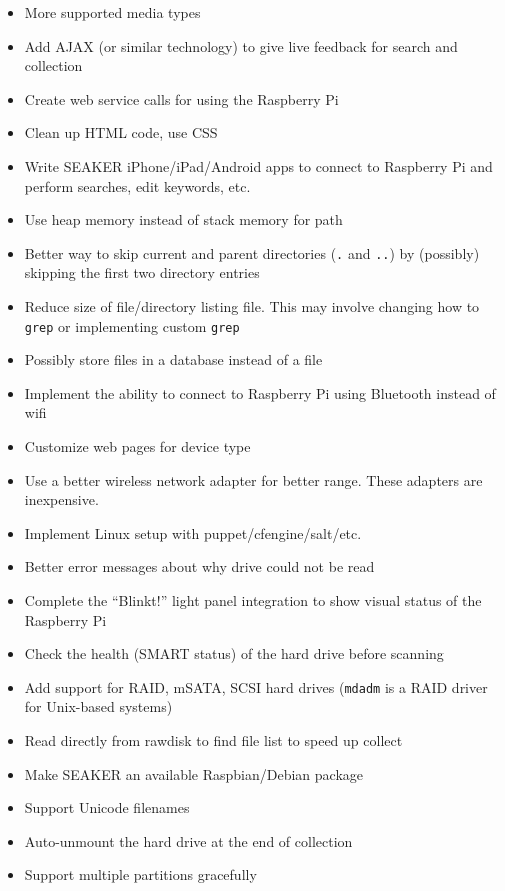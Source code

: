 \documentclass[12pt]{article}
\begin{document}
\footnotesize{
\vspace{0.5 cm}
\begin{itemize}
  \item More supported media types
  \item Add AJAX (or similar technology) to give live feedback for search and collection
  \item Create web service calls for using the Raspberry Pi
  \item Clean up HTML code, use CSS
  \item Write SEAKER iPhone/iPad/Android apps to connect to Raspberry Pi and perform searches, edit keywords, etc.
  \item Use heap memory instead of stack memory for path
  \item Better way to skip current and parent directories (\verb|.| and \verb|..|) by (possibly) skipping the first two directory entries
  \item Reduce size of file/directory listing file. This may involve changing how to \verb|grep| or implementing custom \verb|grep|
  \item Possibly store files in a database instead of a file
  \item Implement the ability to connect to Raspberry Pi using Bluetooth instead of \gls{wifi}
  \item Customize web pages for device type
  \item Use a better wireless network adapter for better range. These adapters are inexpensive.
  \item Implement Linux setup with puppet/cfengine/salt/etc.
  \item Better error messages about why drive could not be read
  \item Complete the “Blinkt!” light panel integration to show visual status of the Raspberry Pi
  \item Check the health (SMART status) of the hard drive before scanning
  \item Add support for RAID, mSATA, SCSI hard drives (\verb|mdadm| is a RAID driver for Unix-based systems)
  \item Read directly from rawdisk to find file list to speed up collect
  \item Make SEAKER an available Raspbian/Debian package
  \item Support Unicode filenames
  \item Auto-unmount the hard drive at the end of collection
  \item Support multiple partitions gracefully

\end{itemize}}
\end{document}
